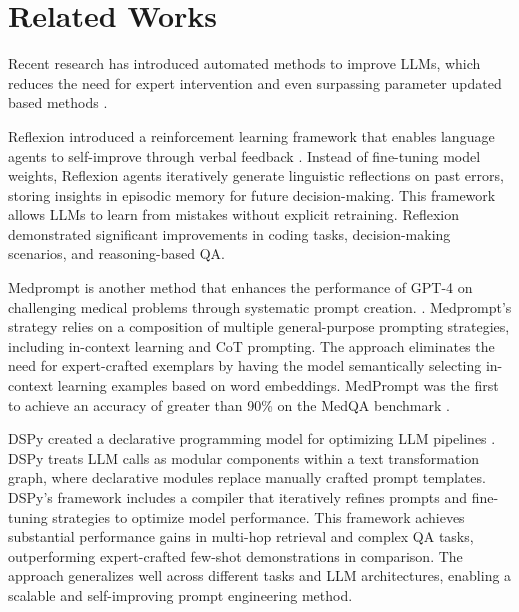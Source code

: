 \section{Related Works}
Recent research has introduced automated methods to improve LLMs, which reduces the need for expert intervention and even surpassing parameter updated based methods \cite{pryzant2023automatic, li2024promptist, kepel2024autonomous}.

Reflexion introduced a reinforcement learning framework that enables language agents to self-improve through verbal feedback \cite{shinn2023reflexion}. Instead of fine-tuning model weights, Reflexion agents iteratively generate linguistic reflections on past errors, storing insights in episodic memory for future decision-making. This framework allows LLMs to learn from mistakes without explicit retraining. Reflexion demonstrated significant improvements in coding tasks, decision-making scenarios, and reasoning-based QA. 

Medprompt is another method that enhances the performance of GPT-4 on challenging medical problems through systematic prompt creation. \cite{nori2023generalist}. Medprompt's strategy relies on a composition of multiple general-purpose prompting strategies, including in-context learning and CoT prompting. The approach eliminates the need for expert-crafted exemplars by having the model semantically selecting in-context learning examples based on word embeddings. MedPrompt was the first to achieve an accuracy of greater than 90\% on the MedQA benchmark \cite{nori2023generalist}.

DSPy created a declarative programming model for optimizing LLM pipelines \cite{khattab2023dspy}. DSPy treats LLM calls as modular components within a text transformation graph, where declarative modules replace manually crafted prompt templates. DSPy's framework includes a compiler that iteratively refines prompts and fine-tuning strategies to optimize model performance. This framework achieves substantial performance gains in multi-hop retrieval and complex QA tasks, outperforming expert-crafted few-shot demonstrations in comparison. The approach generalizes well across different tasks and LLM architectures, enabling a scalable and self-improving prompt engineering method.

